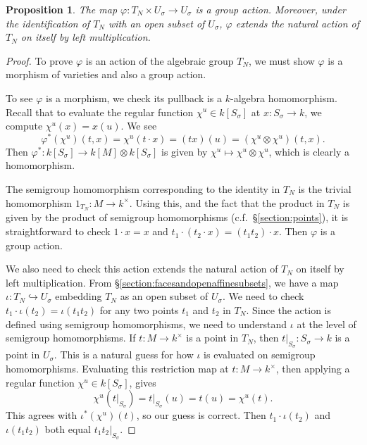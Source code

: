 \documentclass[12pt]{amsart}
\theoremstyle{plain}
\newtheorem{proposition}[theorem]{Proposition}
\begin{document}
\begin{proposition}
The map $\varphi : T_N \times U_\sigma \to U_\sigma$ is a group action.
Moreover, under the identification of $T_N$ with an open subset of $U_\sigma$, $\varphi$ extends the natural action of $T_N$ on itself by left multiplication.
\end{proposition}
\begin{proof}
To prove $\varphi$ is an action of the algebraic group $T_N$, we must show $\varphi$ is a morphism of varieties and also a group action.

To see $\varphi$ is a morphism, we check its pullback is a $k$-algebra homomorphism.
Recall that to evaluate the regular function $\chi^u \in k[S_\sigma]$ at $x : S_\sigma \to k$, we compute $\chi^u(x) = x(u)$.
We see
$$\varphi^*(\chi^u)(t, x) = \chi^u(t\cdot x) = (tx)(u) = (\chi^u \otimes \chi^u)(t,x).$$
Then $\varphi^* : k[S_\sigma] \to k[M] \otimes k[S_\sigma]$ is given by $\chi^u \mapsto \chi^u \otimes \chi^u$, which is clearly a homomorphism.

The semigroup homomorphism corresponding to the identity in $T_N$ is the trivial homomorphism $1_{T_N} : M \to k^\times$.
Using this, and the fact that the product in $T_N$ is given by the product of semigroup homomorphisms (c.f.\ \S \ref{section:points}), it is straightforward to check $1 \cdot x = x$ and $t_1\cdot(t_2\cdot x) = (t_1t_2)\cdot x$.
Then $\varphi$ is a group action.

We also need to check this action extends the natural action of $T_N$ on itself by left multiplication.
From \S\ref{section:facesandopenaffinesubsets}, we have a map $\iota : T_N \hookrightarrow U_\sigma$ embedding $T_N$ as an open subset of $U_\sigma$.
We need to check $t_1 \cdot \iota(t_2) = \iota(t_1 t_2)$ for any two points $t_1$ and $t_2$ in $T_N$.
Since the action is defined using semigroup homomorphisms, we need to understand $\iota$ at the level of semigroup homomorphisms.
If $t : M \to k^\times$ is a point in $T_N$, then $\left. t \right|_{S_\sigma} : S_\sigma \to k$ is a point in $U_\sigma$.
This is a natural guess for how $\iota$ is evaluated on semigroup homomorphisms.
Evaluating this restriction map at $t : M \to k^\times$, then applying a regular function $\chi^u \in k[S_\sigma]$, gives
$$\chi^u(\left. t \right|_{S_\sigma}) = \left. t \right|_{S_\sigma}(u) = t(u) = \chi^u(t).$$
This agrees with $\iota^*(\chi^u)(t)$, so our guess is correct.
Then $t_1 \cdot \iota(t_2)$ and $\iota(t_1 t_2)$ both equal $\left. t_1 t_2 \right|_{S_\sigma}$.
\end{proof}
\end{document}
